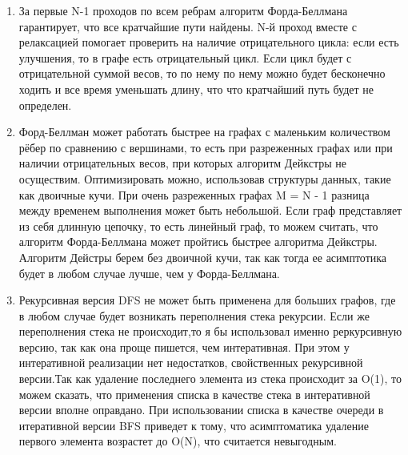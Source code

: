\documentclass[12pt]{article}
\begin{document}
\begin{enumerate}
    \item За первые N-1 проходов по всем ребрам  алгоритм Форда-Беллмана гарантирует, что все кратчайшие пути найдены. N-й проход вместе с релаксацией помогает проверить на наличие отрицательного цикла: если есть улучшения, то в графе есть отрицательный цикл. Если цикл будет с отрицательной суммой весов, то по нему по нему можно будет бесконечно ходить и все время уменьшать длину, что что кратчайший путь будет не определен.
    \item Форд-Беллман может работать быстрее на графах с маленьким количеством рёбер по сравнению с вершинами, то есть при разреженных графах или при наличии отрицательных весов, при которых алгоритм Дейкстры не осуществим. Оптимизировать можно, использовав структуры данных, такие как двоичные кучи. При очень разреженных графах M = N - 1 разница между временем выполнения может быть небольшой. Если граф представляет из себя длинную цепочку, то есть линейный граф, то можем считать, что алгоритм Форда-Беллмана может пройтись быстрее алгоритма Дейкстры. Алгоритм Дейстры берем без двоичной кучи, так как тогда ее асимптотика будет в любом случае лучше, чем у Форда-Беллмана.
    \item Рекурсивная версия DFS не может быть применена для больших графов, где в любом случае будет возникать переполнения стека рекурсии. Если же переполнения стека не происходит,то я бы использовал именно реркурсивную версию, так как она проще пишется, чем интеративная. При этом у интеративной реализации нет недостатков, свойственных рекурсивной версии.Так как удаление последнего элемента из стека происходит за O(1), то можем сказать, что применения списка в качестве стека в интеративной версии вполне оправдано. При использовании списка в качестве очереди в итеративной версии BFS приведет к тому, что асимптоматика удаление первого элемента возрастет до O(N), что считается невыгодным.
\end{enumerate}
\end{document}
